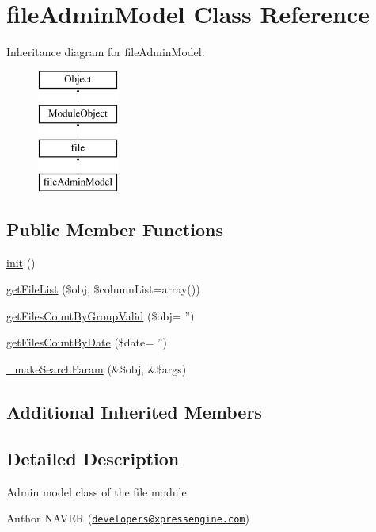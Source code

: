 \hypertarget{classfileAdminModel}{\section{file\-Admin\-Model Class Reference}
\label{classfileAdminModel}
}
Inheritance diagram for file\-Admin\-Model\-:\begin{figure}[H]
\begin{center}
\leavevmode
\includegraphics[height=4.000000cm]{classfileAdminModel}
\end{center}
\end{figure}
\subsection*{Public Member Functions}
\begin{DoxyCompactItemize}
\item 
\hyperlink{classfileAdminModel_a043ae7934f6fb3bb6ef24bff36a63795}{init} ()
\item 
\hyperlink{classfileAdminModel_a19433395ef400eaf33876d93db918a29}{get\-File\-List} (\$obj, \$column\-List=array())
\item 
\hyperlink{classfileAdminModel_a0523b70f599166913414c375318bcc83}{get\-Files\-Count\-By\-Group\-Valid} (\$obj= '')
\item 
\hyperlink{classfileAdminModel_a2cff52618c56e1ebae4e392646c859e8}{get\-Files\-Count\-By\-Date} (\$date= '')
\item 
\hyperlink{classfileAdminModel_a2da869c66512ff677a71674030c8637c}{\-\_\-make\-Search\-Param} (\&\$obj, \&\$args)
\end{DoxyCompactItemize}
\subsection*{Additional Inherited Members}


\subsection{Detailed Description}
Admin model class of the file module \begin{DoxyAuthor}{Author}
N\-A\-V\-E\-R (\href{mailto:developers@xpressengine.com}{\tt developers@xpressengine.\-com}) 
\end{DoxyAuthor}


